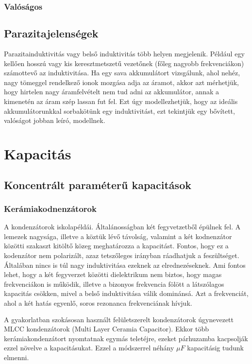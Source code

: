 \documentclass[12pt,a4paper]{article}
\begin{document}
\subsubsection{Valóságos}
\subsection{Parazitajelenségek}
Parazitainduktivitás vagy belső induktivitás több helyen megjelenik. Például egy kellően hosszú vagy kis keresztmetszetű vezetőnek (főleg nagyobb frekvenciákon) számottevő az induktivitása. Ha egy sava akkumulátort vizsgálunk, ahol nehéz, nagy tömeggel rendelkező ionok mozgása adja az áramot, akkor azt mérhetjük, hogy hirtelen nagy áramfelvételt nem tud adni az akkumulátor, annak a kimenetén az áram szép lassan fut fel. Ezt úgy modellezhetjük, hogy az ideális akkumulátorunkkal sorbakötünk egy induktivitást, ezt tekintjük egy bővített, valóságot jobban leíró, modellnek.

\section{Kapacitás}
\subsection{Koncentrált paraméterű kapacitások}
\subsubsection{Kerámiakodnenzátorok}
A kondenzátorok iskolapéldái. Általánosságban két fegyvetzetből épülnek fel. A lemezek nagysága, illetve a köztük lévő távolság, valamint a két kodnenzátor közötti szakaszt kitöltő közeg meghatározza a kapacitást.
Fontos, hogy ez a kodenzátor nem polarizált, azaz tetszőleges irányban ráadhatjuk a feszültséget. Általában nincs is túl nagy induktivitása ezeknek az elrednezéseknek. Ami fontos lehet, hogy a két fegyverzet közötti dielektrikum nem biztos, hogy magas frekvenciákon is működik, illetve a bizonyos frekvencia fölött a látszólagos kapacitás csökken, mivel a belső induktivitása válik dominánsá. Azt a frekvenciát, ahol a két hatás egyenlő, soros rezonanca frekvenciának hívjuk.
\par A gyakorlatban szokásosan használt felületszerelt kondenzátorok úgynevezett MLCC kondenzátorok (Multi Layer Ceramia Capacitor). Ekkor több kerámiakondenzátort nyomtatnak egymás teletéjre, ezeket párhuzamba kacpsolják ezzel növelve a kapacitásukat. Ezzel a módszerrel néhány \( \mu F\) kapacitásig tudunk elmenni.
\end{document}
